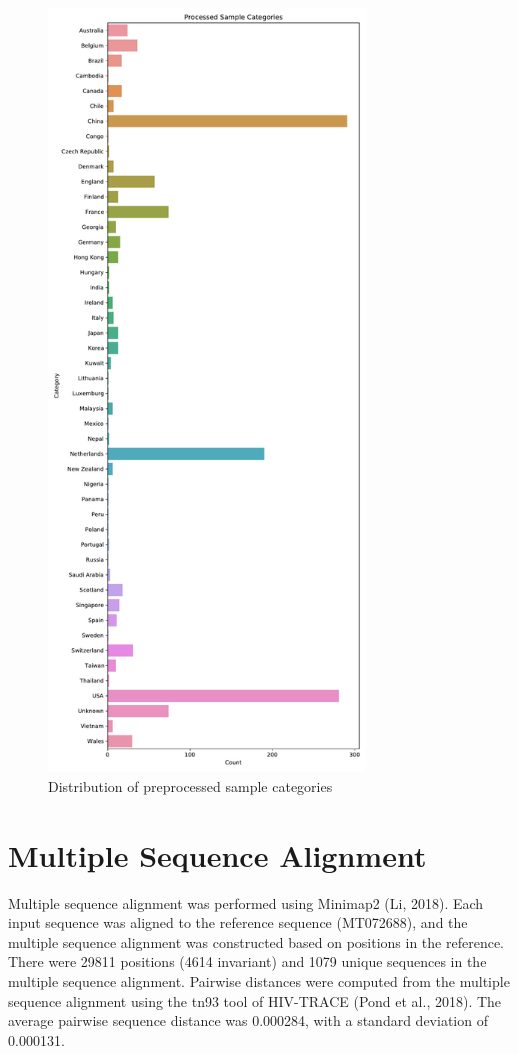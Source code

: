 \documentclass{article}
\begin{document}
\begin{figure}[h]
\centering
\includegraphics[width=0.75\textwidth,keepaspectratio]{./figs/processed_input_categories.pdf}
\caption{Distribution of preprocessed sample categories}
\end{figure}

\section{Multiple Sequence Alignment}
Multiple sequence alignment was performed using Minimap2 (Li, 2018). Each input sequence was aligned to the reference sequence (MT072688), and the multiple sequence alignment was constructed based on positions in the reference. There were 29811 positions (4614 invariant) and 1079 unique sequences in the multiple sequence alignment. Pairwise distances were computed from the multiple sequence alignment using the tn93 tool of HIV-TRACE (Pond et al., 2018). The average pairwise sequence distance was 0.000284, with a standard deviation of 0.000131.
\end{document}
